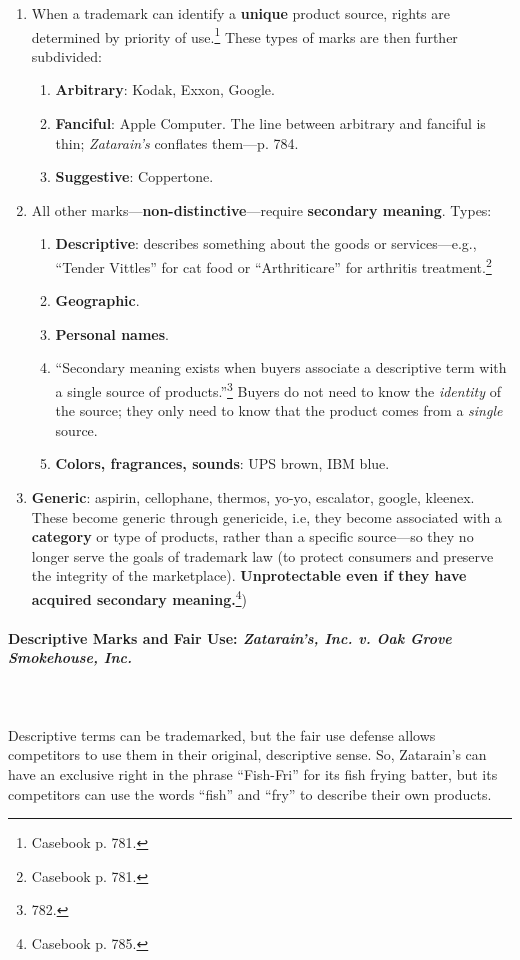 \begin{enumerate}
    \item When a trademark can identify a \textbf{unique} product source, 
    rights are determined by priority of use.\footnote{Casebook p. 781.} These 
    types of marks are then further subdivided:
    \begin{enumerate}
        \item \textbf{Arbitrary}: Kodak, Exxon, Google.
        \item \textbf{Fanciful}: Apple Computer. The line between arbitrary 
        and fanciful is thin; \emph{Zatarain's} conflates them---p. 784.
    \item \textbf{Suggestive}: Coppertone.
    \end{enumerate}
    \item All other marks---\textbf{non-distinctive}---require 
    \textbf{secondary meaning}. Types:
    \begin{enumerate}
        \item \textbf{Descriptive}: describes something about the 
        goods or services---e.g., ``Tender Vittles'' for cat food or 
        ``Arthriticare'' for arthritis treatment.\footnote{Casebook p. 781.} 
        \item \textbf{Geographic}.
        \item \textbf{Personal names}.
        \item ``Secondary meaning exists when buyers associate a descriptive 
        term with a single source of products.''\footnote{782.} Buyers do not 
        need to know the \emph{identity} of the source; they only need to know 
        that the product comes from a \emph{single} source.
        \item \textbf{Colors, fragrances, sounds}: UPS brown, IBM blue.
    \end{enumerate}
    \item \textbf{Generic}: aspirin, cellophane, thermos, yo-yo, escalator, 
    google, kleenex. These become generic through genericide, i.e, they 
    become associated with a \textbf{category} or type of products, rather 
    than a specific source---so they no longer serve the goals of trademark 
    law (to protect consumers and preserve the integrity of the marketplace).  
    \textbf{Unprotectable even if they have acquired secondary 
    meaning.}\footnote{Casebook p. 785.})
\end{enumerate}

\paragraph{Descriptive Marks and Fair Use: \emph{Zatarain's, Inc. v. Oak Grove 
Smokehouse, Inc.}}
~\\\\
Descriptive terms can be trademarked, but the fair use defense allows 
competitors to use them in their original, descriptive sense. So, Zatarain's 
can have an exclusive right in the phrase ``Fish-Fri'' for its fish frying 
batter, but its competitors can use the words ``fish'' and ``fry'' to describe 
their own products.

